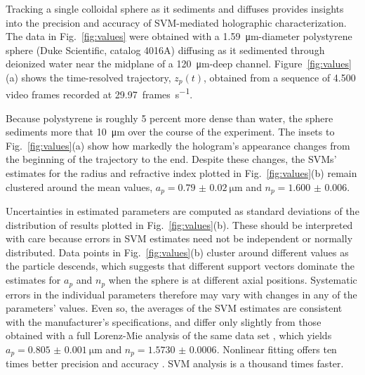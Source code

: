 Tracking a single colloidal sphere as it sediments and diffuses
provides insights into
the precision and accuracy of SVM-mediated holographic characterization.
The data in Fig.~\ref{fig:values} were obtained with
a \SI{1.59}{\um}-diameter
polystyrene sphere (Duke Scientific, catalog 4016A)
diffusing as it sedimented through
deionized water near the midplane of
a \SI{120}{\um}-deep channel.
Figure~\ref{fig:values}(a) shows the time-resolved
trajectory, $z_p(t)$, obtained from a sequence of \num{4,500} video frames
recorded at \SI{29.97}{frames\per\second}.

Because polystyrene is roughly 5 percent more dense than water,
the sphere sediments
more that \SI{10}{\um} over the
course of the experiment.
The insets to Fig.~\ref{fig:values}(a) show how markedly
the hologram's appearance changes from the beginning
of the trajectory to the end.
Despite these changes, the SVMs' estimates for the
radius and refractive index plotted in Fig.~\ref{fig:values}(b)
remain clustered around the mean values,
$a_p = \SI{0.79(2)}{\um}$
and 
$n_p = \num{1.600(6)}$.

Uncertainties in estimated parameters are computed as
standard deviations of the distribution of results
plotted in Fig.~\ref{fig:values}(b).
These should be interpreted with care because errors in SVM estimates
need not be independent or normally distributed.
Data points in Fig.~\ref{fig:values}(b) cluster around
different values as the particle descends,
which suggests that different support 
vectors dominate the estimates for $a_p$ and $n_p$
when the sphere is at different axial positions.
Systematic errors in the individual parameters therefore may 
vary with changes in any of the parameters' values.
Even so, the averages of the SVM estimates
are consistent with the manufacturer's specifications,
and differ only slightly from those obtained
with a full Lorenz-Mie analysis of the same data set
\cite{krishnatreya14},
which yields $a_p = \SI{0.805(1)}{\um}$ and
$n_p = \num{1.5730(6)}$.
Nonlinear fitting offers ten times better precision and
accuracy \cite{krishnatreya14}.
SVM analysis is a thousand times faster.

